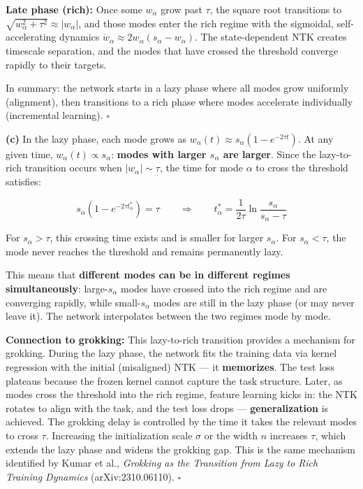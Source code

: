 \documentclass[
]{article}
\begin{document}
\textbf{Late phase (rich):} Once some \(w_\alpha\) grow past \(\tau\),
the square root transitions to
\(\sqrt{w_\alpha^2 + \tau^2} \approx |w_\alpha|\), and those modes enter
the rich regime with the sigmoidal, self-accelerating dynamics
\(\dot{w}_\alpha \approx 2w_\alpha(s_\alpha - w_\alpha)\). The
state-dependent NTK creates timescale separation, and the modes that
have crossed the threshold converge rapidly to their targets.

In summary: the network starts in a lazy phase where all modes grow
uniformly (alignment), then transitions to a rich phase where modes
accelerate individually (incremental learning). \(\square\)

\textbf{(c)} In the lazy phase, each mode grows as
\(w_\alpha(t) \approx s_\alpha(1 - e^{-2\tau t})\). At any given time,
\(w_\alpha(t) \propto s_\alpha\): \textbf{modes with larger \(s_\alpha\)
are larger}. Since the lazy-to-rich transition occurs when
\(|w_\alpha| \sim \tau\), the time for mode \(\alpha\) to cross the
threshold satisfies:

\[s_\alpha(1 - e^{-2\tau t_\alpha^*}) = \tau \qquad \Longrightarrow \qquad t_\alpha^* = \frac{1}{2\tau}\ln\frac{s_\alpha}{s_\alpha - \tau}\]

For \(s_\alpha > \tau\), this crossing time exists and is smaller for
larger \(s_\alpha\). For \(s_\alpha < \tau\), the mode never reaches the
threshold and remains permanently lazy.

This means that \textbf{different modes can be in different regimes
simultaneously}: large-\(s_\alpha\) modes have crossed into the rich
regime and are converging rapidly, while small-\(s_\alpha\) modes are
still in the lazy phase (or may never leave it). The network
interpolates between the two regimes mode by mode.

\textbf{Connection to grokking:} This lazy-to-rich transition provides a
mechanism for grokking. During the lazy phase, the network fits the
training data via kernel regression with the initial (misaligned) NTK
--- it \textbf{memorizes}. The test loss plateaus because the frozen
kernel cannot capture the task structure. Later, as modes cross the
threshold into the rich regime, feature learning kicks in: the NTK
rotates to align with the task, and the test loss drops ---
\textbf{generalization} is achieved. The grokking delay is controlled by
the time it takes the relevant modes to cross \(\tau\). Increasing the
initialization scale \(\sigma\) or the width \(n\) increases \(\tau\),
which extends the lazy phase and widens the grokking gap. This is the
same mechanism identified by Kumar et al., \emph{Grokking as the
Transition from Lazy to Rich Training Dynamics} (arXiv:2310.06110).
\(\square\)
\end{document}
